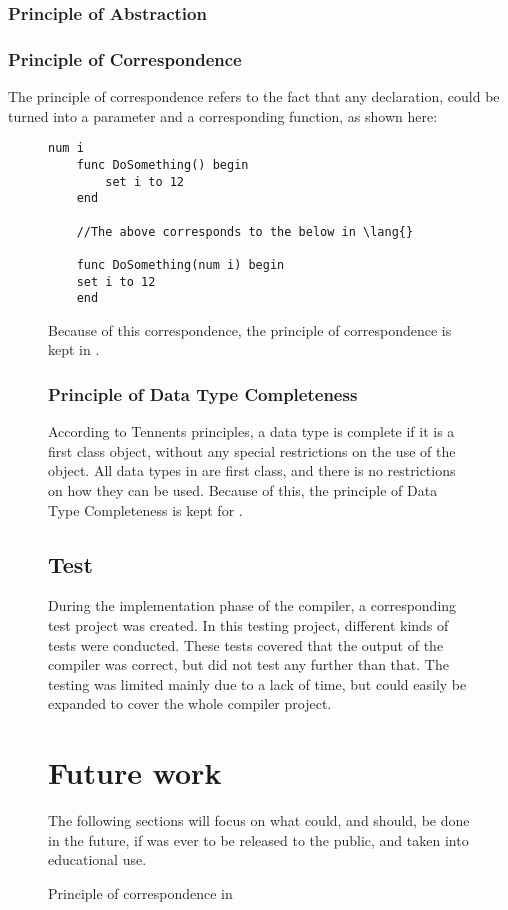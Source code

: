 \subsubsection{Principle of Abstraction}


\subsubsection{Principle of Correspondence}
The principle of correspondence refers to the fact that any declaration, could be turned into a parameter and a corresponding function, as shown here:
\begin{figure}
    \centering
    \begin{lstlisting}[style=gglang]
    num i
    func DoSomething() begin
        set i to 12
    end
    
    //The above corresponds to the below in \lang{}
    
    func DoSomething(num i) begin
    set i to 12
    end
    \end{lstlisting}
    \caption{Principle of correspondence in \lang{}}
    \label{fig:niggers}
Because of this correspondence, the principle of correspondence is kept in \lang{}.
\subsubsection{Principle of Data Type Completeness}
According to Tennents principles, a data type is complete if it is a first class object, without any special restrictions on the use of the object. All data types in \lang{} are first class, and there is no restrictions on how they can be used. Because of this, the principle of Data Type Completeness is kept for \lang{}.

\subsection{Test}
During the implementation phase of the compiler, a corresponding test project was created. In this testing project, different kinds of tests were conducted. These tests covered that the output of the compiler was correct, but did not test any further than that. The testing was limited mainly due to a lack of time, but could easily be expanded to cover the whole compiler project. 

\section{Future work}
The following sections will focus on what could, and should, be done in the future, if \lang{} was ever to be released to the public, and taken into educational use.


\end{figure}
